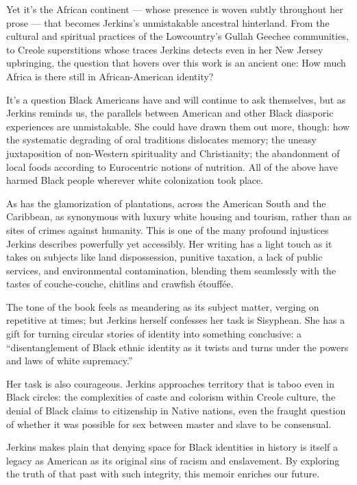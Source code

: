 Yet it's the African continent --- whose presence is woven subtly
throughout her prose --- that becomes Jerkins's unmistakable ancestral
hinterland. From the cultural and spiritual practices of the
Lowcountry's Gullah Geechee communities, to Creole superstitions whose
traces Jerkins detects even in her New Jersey upbringing, the question
that hovers over this work is an ancient one: How much Africa is there
still in African-American identity?

It's a question Black Americans have and will continue to ask
themselves, but as Jerkins reminds us, the parallels between American
and other Black diasporic experiences are unmistakable. She could have
drawn them out more, though: how the systematic degrading of oral
traditions dislocates memory; the uneasy juxtaposition of non-Western
spirituality and Christianity; the abandonment of local foods according
to Eurocentric notions of nutrition. All of the above have harmed Black
people wherever white colonization took place.

As has the glamorization of plantations, across the American South and
the Caribbean, as synonymous with luxury white housing and tourism,
rather than as sites of crimes against humanity. This is one of the many
profound injustices Jerkins describes powerfully yet accessibly. Her
writing has a light touch as it takes on subjects like land
dispossession, punitive taxation, a lack of public services, and
environmental contamination, blending them seamlessly with the tastes of
couche-couche, chitlins and crawfish étouffée.

The tone of the book feels as meandering as its subject matter, verging
on repetitive at times; but Jerkins herself confesses her task is
Sisyphean. She has a gift for turning circular stories of identity into
something conclusive: a ``disentanglement of Black ethnic identity as it
twists and turns under the powers and laws of white supremacy.''

Her task is also courageous. Jerkins approaches territory that is taboo
even in Black circles: the complexities of caste and colorism within
Creole culture, the denial of Black claims to citizenship in Native
nations, even the fraught question of whether it was possible for sex
between master and slave to be consensual.

Jerkins makes plain that denying space for Black identities in history
is itself a legacy as American as its original sins of racism and
enslavement. By exploring the truth of that past with such integrity,
this memoir enriches our future.

